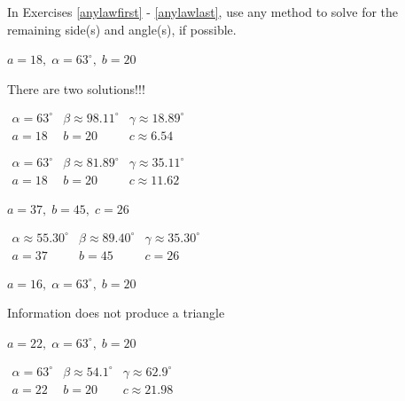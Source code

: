 \documentclass{ximera}
\begin{document}
\begin{question}
In Exercises \ref{anylawfirst} - \ref{anylawlast}, use any method to solve for the remaining side(s) and angle(s), if possible.

\begin{problem} \label{ambigfirst} \label{anylawfirst}
$a = 18, \; \alpha = 63^{\circ}, \; b = 20$ 

\begin{solution}
There are two solutions!!!

$\begin{array}{lll}
\alpha = 63^{\circ} & \beta \approx 98.11^{\circ} & \gamma \approx 18.89^{\circ} \\
a = 18 & b = 20 & c \approx 6.54 \end{array}$

$\begin{array}{lll}
\alpha = 63^{\circ} & \beta \approx 81.89^{\circ} & \gamma \approx 35.11^{\circ} \\
a = 18 & b = 20 & c \approx 11.62 \end{array}$
\end{solution}
\end{problem}

\begin{problem}
$a = 37, \; b = 45, \; c = 26$

\begin{solution}
$\begin{array}{lll}
\alpha \approx 55.30^{\circ} & \beta \approx 89.40^{\circ} & \gamma \approx 35.30^{\circ} \\
a = 37 & b = 45 & c = 26 \end{array}$
\end{solution}
\end{problem}

\begin{problem} \label{ambigsecond}
$a = 16, \; \alpha = 63^{\circ}, \; b = 20$ 

\begin{solution}
Information does not produce a triangle 
\end{solution}
\end{problem}

\begin{problem} \label{ambigthird}
$a = 22, \; \alpha = 63^{\circ}, \; b = 20$ 

\begin{solution}
$\begin{array}{lll}
\alpha = 63^{\circ} & \beta \approx 54.1^{\circ} & \gamma \approx 62.9^{\circ} \\
a = 22 & b = 20 & c \approx 21.98 \end{array}$
\end{solution}
\end{problem}


\end{question}
\end{document}
